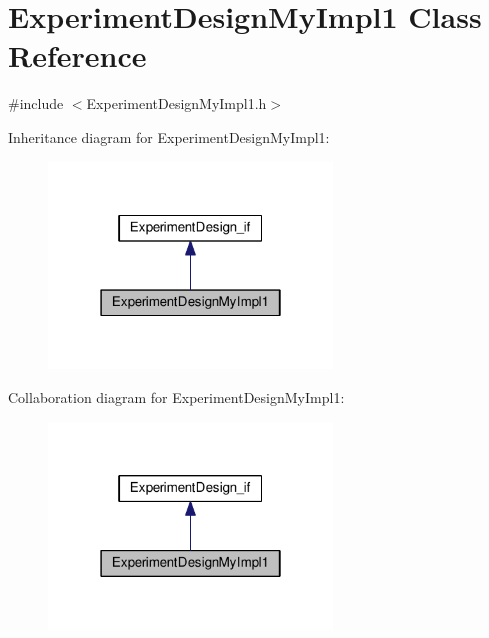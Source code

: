 \hypertarget{class_experiment_design_my_impl1}{\section{Experiment\-Design\-My\-Impl1 Class Reference}
\label{class_experiment_design_my_impl1}
}


{\ttfamily \#include $<$Experiment\-Design\-My\-Impl1.\-h$>$}



Inheritance diagram for Experiment\-Design\-My\-Impl1\-:\nopagebreak
\begin{figure}[H]
\begin{center}
\leavevmode
\includegraphics[width=214pt]{class_experiment_design_my_impl1__inherit__graph}
\end{center}
\end{figure}


Collaboration diagram for Experiment\-Design\-My\-Impl1\-:\nopagebreak
\begin{figure}[H]
\begin{center}
\leavevmode
\includegraphics[width=214pt]{class_experiment_design_my_impl1__coll__graph}
\end{center}
\end{figure}

